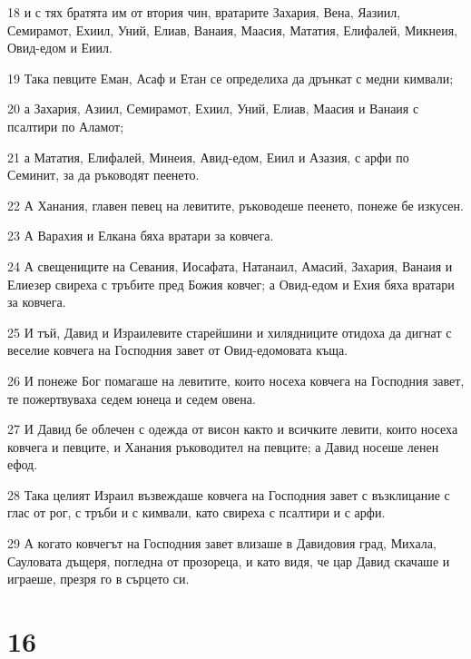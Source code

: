 \par 18 и с тях братята им от втория чин, вратарите Захария, Вена, Яазиил, Семирамот, Ехиил, Уний, Елиав, Ванаия, Маасия, Мататия, Елифалей, Микнеия, Овид-едом и Еиил.
\par 19 Така певците Еман, Асаф и Етан се определиха да дрънкат с медни кимвали;
\par 20 а Захария, Азиил, Семирамот, Ехиил, Уний, Елиав, Маасия и Ванаия с псалтири по Аламот;
\par 21 а Мататия, Елифалей, Минеия, Авид-едом, Еиил и Азазия, с арфи по Семинит, за да ръководят пеенето.
\par 22 А Ханания, главен певец на левитите, ръководеше пеенето, понеже бе изкусен.
\par 23 А Варахия и Елкана бяха вратари за ковчега.
\par 24 А свещениците на Севания, Иосафата, Натанаил, Амасий, Захария, Ванаия и Елиезер свиреха с тръбите пред Божия ковчег; а Овид-едом и Ехия бяха вратари за ковчега.
\par 25 И тъй, Давид и Израилевите старейшини и хилядниците отидоха да дигнат с веселие ковчега на Господния завет от Овид-едомовата къща.
\par 26 И понеже Бог помагаше на левитите, които носеха ковчега на Господния завет, те пожертвуваха седем юнеца и седем овена.
\par 27 И Давид бе облечен с одежда от висон както и всичките левити, които носеха ковчега и певците, и Ханания ръководител на певците; а Давид носеше ленен ефод.
\par 28 Така целият Израил възвеждаше ковчега на Господния завет с възклицание с глас от рог, с тръби и с кимвали, като свиреха с псалтири и с арфи.
\par 29 А когато ковчегът на Господния завет влизаше в Давидовия град, Михала, Сауловата дъщеря, погледна от прозореца, и като видя, че цар Давид скачаше и играеше, презря го в сърцето си.

\chapter{16}

